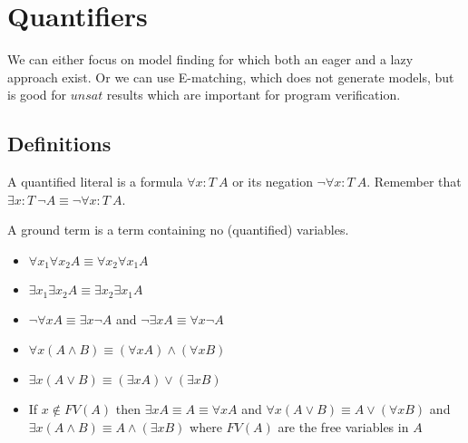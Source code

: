 \section{Quantifiers}
\begin{mytitle}[Approaches] We can either focus on model finding for which both an eager and a lazy approach exist. Or we can use E-matching, which does not generate models, but is good for $unsat$ results which are important for program verification. 
\end{mytitle}
\subsection{Definitions}
\begin{mytitle} A quantified literal is a formula $\forall x: T\ A$ or its negation $\lnot \forall x: T\ A$. Remember that $\exists x: T\ \lnot A \equiv \lnot\forall x: T\ A$.
\end{mytitle}
\begin{mytitle} A ground term is a term containing no (quantified) variables.
\end{mytitle}
\begin{mytitle}[Equalities]\hfill
\begin{itemize}
    \item $\forall x_1 \forall x_2 A \equiv \forall x_2 \forall x_1 A$
    \item $\exists x_1 \exists x_2 A \equiv \exists x_2 \exists x_1 A$
    \item $\lnot \forall x A \equiv \exists x \lnot A$ and $\lnot \exists x A \equiv \forall x \lnot A$
    \item $\forall x (A \land B) \equiv (\forall x A) \land (\forall x B)$
    \item $\exists x (A\lor B) \equiv (\exists x A) \lor (\exists x B)$
    \item If $x\not\in FV(A)$ then $\exists x A \equiv A \equiv \forall x A$ and $\forall x (A\lor B) \equiv A \lor (\forall x B)$ and $\exists x (A\land B) \equiv A \land (\exists x B)$ where $FV(A)$ are the free variables in $A$
\end{itemize}
\end{mytitle}

